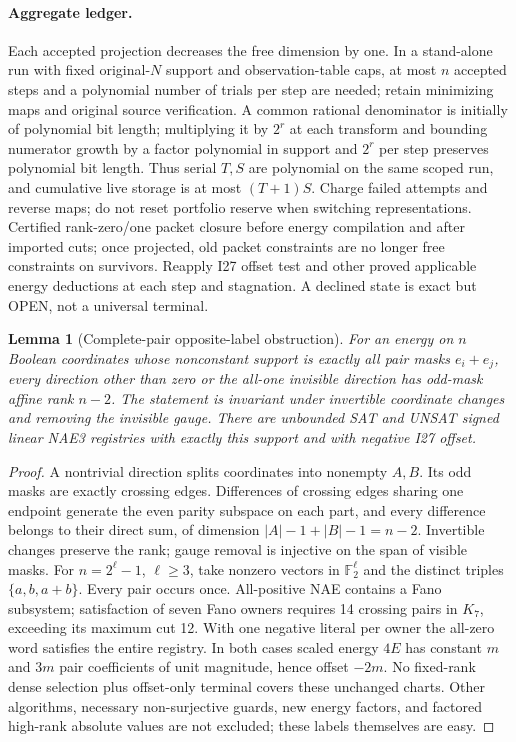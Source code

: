 \documentclass[11pt]{article}
\newtheorem{lemma}[theorem]{Lemma}
\begin{document}
\paragraph{Aggregate ledger.}
Each accepted projection decreases the free dimension by one. In a stand-alone run with fixed original-$N$ support and observation-table caps, at most $n$ accepted steps and a polynomial number of trials per step are needed; retain minimizing maps and original source verification. A common rational denominator is initially of polynomial bit length; multiplying it by $2^r$ at each transform and bounding numerator growth by a factor polynomial in support and $2^r$ per step preserves polynomial bit length. Thus serial $T,S$ are polynomial on the same scoped run, and cumulative live storage is at most $(T+1)S$. Charge failed attempts and reverse maps; do not reset portfolio reserve when switching representations. Certified rank-zero/one packet closure before energy compilation and after imported cuts; once projected, old packet constraints are no longer free constraints on survivors. Reapply I27 offset test and other proved applicable energy deductions at each step and stagnation. A declined state is exact but OPEN, not a universal terminal.
\begin{lemma}[Complete-pair opposite-label obstruction]\label{lem:ds21-clique}
For an energy on $n$ Boolean coordinates whose nonconstant support is exactly all pair masks $e_i+e_j$, every direction other than zero or the all-one invisible direction has odd-mask affine rank $n-2$. The statement is invariant under invertible coordinate changes and removing the invisible gauge. There are unbounded SAT and UNSAT signed linear NAE3 registries with exactly this support and with negative I27 offset.
\end{lemma}
\begin{proof}
A nontrivial direction splits coordinates into nonempty $A,B$. Its odd masks are exactly crossing edges. Differences of crossing edges sharing one endpoint generate the even parity subspace on each part, and every difference belongs to their direct sum, of dimension $|A|-1+|B|-1=n-2$. Invertible changes preserve the rank; gauge removal is injective on the span of visible masks. For $n=2^\ell-1$, $\ell\ge3$, take nonzero vectors in $\mathbb F_2^\ell$ and the distinct triples $\{a,b,a+b\}$. Every pair occurs once. All-positive NAE contains a Fano subsystem; satisfaction of seven Fano owners requires 14 crossing pairs in $K_7$, exceeding its maximum cut 12. With one negative literal per owner the all-zero word satisfies the entire registry. In both cases scaled energy $4E$ has constant $m$ and $3m$ pair coefficients of unit magnitude, hence offset $-2m$. No fixed-rank dense selection plus offset-only terminal covers these unchanged charts. Other algorithms, necessary non-surjective guards, new energy factors, and factored high-rank absolute values are not excluded; these labels themselves are easy.
\end{proof}
\end{document}
